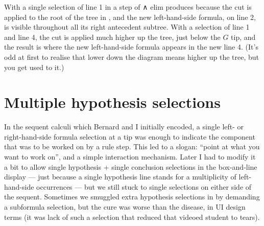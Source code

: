 With a single selection of line 1 in  a step of ∧ elim produces  because the cut is applied to the root of the tree in , and the new left-hand-side formula, on line 2, is visible throughout all its right antecedent subtree. With a selection of line 1 and line 4, the cut is applied much higher up the tree, just below the $G$ tip, and the result is  where the new left-hand-side formula appears in the new line 4. (It's odd at first to realise that lower down the diagram means higher up the tree, but you get used to it.)

\section{Multiple hypothesis selections}

In the sequent calculi which Bernard and I initially encoded, a single left- or right-hand-side formula selection at a tip was enough to indicate the component that was to be worked on by a rule step. This led to a slogan: ``point at what you want to work on'', and a simple interaction mechanism. Later I had to modify it a bit to allow single hypothesis + single conclusion selections in the box-and-line display --- just because a single hypothesis line stands for a multiplicity of left-hand-side occurrences --- but we still stuck to single selections on either side of the sequent. Sometimes we smuggled extra hypothesis selections in by demanding a subformula selection, but the cure was worse than the disease, in UI design terms (it was lack of such a selection that reduced that videoed student to tears).

